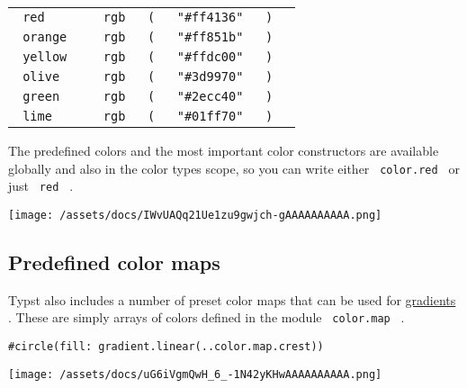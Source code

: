 \begin{longtable}[]{@{}ll@{}}
\texttt{\ red\ } &
\texttt{\ }{\texttt{\ rgb\ }}\texttt{\ }{\texttt{\ (\ }}\texttt{\ }{\texttt{\ "\#ff4136"\ }}\texttt{\ }{\texttt{\ )\ }}\texttt{\ } \\
\texttt{\ orange\ } &
\texttt{\ }{\texttt{\ rgb\ }}\texttt{\ }{\texttt{\ (\ }}\texttt{\ }{\texttt{\ "\#ff851b"\ }}\texttt{\ }{\texttt{\ )\ }}\texttt{\ } \\
\texttt{\ yellow\ } &
\texttt{\ }{\texttt{\ rgb\ }}\texttt{\ }{\texttt{\ (\ }}\texttt{\ }{\texttt{\ "\#ffdc00"\ }}\texttt{\ }{\texttt{\ )\ }}\texttt{\ } \\
\texttt{\ olive\ } &
\texttt{\ }{\texttt{\ rgb\ }}\texttt{\ }{\texttt{\ (\ }}\texttt{\ }{\texttt{\ "\#3d9970"\ }}\texttt{\ }{\texttt{\ )\ }}\texttt{\ } \\
\texttt{\ green\ } &
\texttt{\ }{\texttt{\ rgb\ }}\texttt{\ }{\texttt{\ (\ }}\texttt{\ }{\texttt{\ "\#2ecc40"\ }}\texttt{\ }{\texttt{\ )\ }}\texttt{\ } \\
\texttt{\ lime\ } &
\texttt{\ }{\texttt{\ rgb\ }}\texttt{\ }{\texttt{\ (\ }}\texttt{\ }{\texttt{\ "\#01ff70"\ }}\texttt{\ }{\texttt{\ )\ }}\texttt{\ } \\
\end{longtable}

The predefined colors and the most important color constructors are
available globally and also in the color type\textquotesingle s scope,
so you can write either \texttt{\ color.red\ } or just \texttt{\ red\ }
.

\texttt{[image: /assets/docs/IWvUAQq21Ue1zu9gwjch-gAAAAAAAAAA.png]}

\subsection{Predefined color maps}\label{predefined-color-maps}

Typst also includes a number of preset color maps that can be used for
\href{/docs/reference/visualize/gradient/\#definitions-linear}{gradients}
. These are simply arrays of colors defined in the module
\texttt{\ color.map\ } .

\begin{verbatim}
#circle(fill: gradient.linear(..color.map.crest))
\end{verbatim}

\texttt{[image: /assets/docs/uG6iVgmQwH\_6\_-1N42yKHwAAAAAAAAAA.png]}

